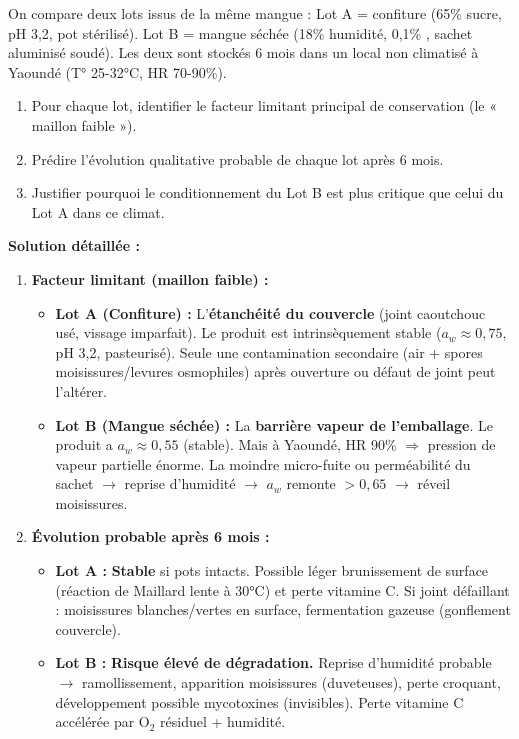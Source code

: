\documentclass[11pt]{article}
\begin{document}
\begin{exoresolu}
On compare deux lots issus de la même mangue : Lot A = confiture (65\% sucre, pH 3,2, pot stérilisé). Lot B = mangue séchée (18\% humidité, 0,1\% , sachet aluminisé soudé). Les deux sont stockés 6 mois dans un local non climatisé à Yaoundé (T° 25-32°C, HR 70-90\%).
\begin{enumerate}
    \item Pour chaque lot, identifier le facteur limitant principal de conservation (le « maillon faible »).
    \item Prédire l'évolution qualitative probable de chaque lot après 6 mois.
    \item Justifier pourquoi le conditionnement du Lot B est plus critique que celui du Lot A dans ce climat.
\end{enumerate}
\tcblower
\textbf{Solution détaillée :}
\begin{enumerate}
    \item \textbf{Facteur limitant (maillon faible) :}
    \begin{itemize}
        \item \textbf{Lot A (Confiture) :} L'\textbf{étanchéité du couvercle} (joint caoutchouc usé, vissage imparfait). Le produit est intrinsèquement stable ($a_w \approx 0{,}75$, pH 3,2, pasteurisé). Seule une contamination secondaire (air + spores moisissures/levures osmophiles) après ouverture ou défaut de joint peut l'altérer.
        \item \textbf{Lot B (Mangue séchée) :} La \textbf{barrière vapeur de l'emballage}. Le produit a $a_w \approx 0{,}55$ (stable). Mais à Yaoundé, HR 90\% $\Rightarrow$ pression de vapeur partielle énorme. La moindre micro-fuite ou perméabilité du sachet $\rightarrow$ reprise d'humidité $\rightarrow$ $a_w$ remonte $> 0{,}65$ $\rightarrow$ réveil moisissures.
    \end{itemize}
    \item \textbf{Évolution probable après 6 mois :}
    \begin{itemize}
        \item \textbf{Lot A :} \textbf{Stable} si pots intacts. Possible léger brunissement de surface (réaction de Maillard lente à 30°C) et perte vitamine C. Si joint défaillant : moisissures blanches/vertes en surface, fermentation gazeuse (gonflement couvercle).
        \item \textbf{Lot B :} \textbf{Risque élevé de dégradation.} Reprise d'humidité probable $\rightarrow$ ramollissement, apparition moisissures (duveteuses), perte croquant, développement possible mycotoxines (invisibles). Perte vitamine C accélérée par O$_2$ résiduel + humidité.

\end{itemize}
\end{enumerate}
\end{exoresolu}
\end{document}
